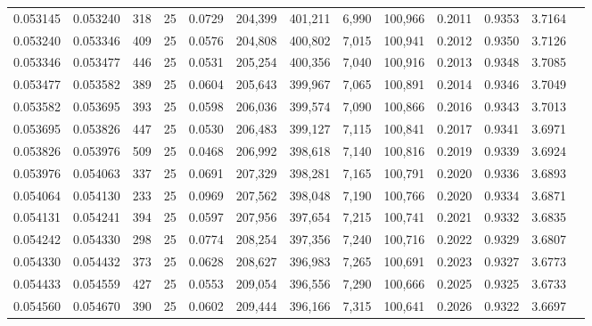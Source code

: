 \begin{tabular}{rrrrrrrrrrrrr}
0.053145 & 0.053240 &   318 &  25 &                                     0.0729 & 204,399 & 401,211 &   6,990 & 100,966 & 0.2011 & 0.9353 & 3.7164 \\
0.053240 & 0.053346 &   409 &  25 &                                     0.0576 & 204,808 & 400,802 &   7,015 & 100,941 & 0.2012 & 0.9350 & 3.7126 \\
0.053346 & 0.053477 &   446 &  25 &                                     0.0531 & 205,254 & 400,356 &   7,040 & 100,916 & 0.2013 & 0.9348 & 3.7085 \\
0.053477 & 0.053582 &   389 &  25 &                                     0.0604 & 205,643 & 399,967 &   7,065 & 100,891 & 0.2014 & 0.9346 & 3.7049 \\
0.053582 & 0.053695 &   393 &  25 &                                     0.0598 & 206,036 & 399,574 &   7,090 & 100,866 & 0.2016 & 0.9343 & 3.7013 \\
0.053695 & 0.053826 &   447 &  25 &                                     0.0530 & 206,483 & 399,127 &   7,115 & 100,841 & 0.2017 & 0.9341 & 3.6971 \\
0.053826 & 0.053976 &   509 &  25 &                                     0.0468 & 206,992 & 398,618 &   7,140 & 100,816 & 0.2019 & 0.9339 & 3.6924 \\
0.053976 & 0.054063 &   337 &  25 &                                     0.0691 & 207,329 & 398,281 &   7,165 & 100,791 & 0.2020 & 0.9336 & 3.6893 \\
0.054064 & 0.054130 &   233 &  25 &                                     0.0969 & 207,562 & 398,048 &   7,190 & 100,766 & 0.2020 & 0.9334 & 3.6871 \\
0.054131 & 0.054241 &   394 &  25 &                                     0.0597 & 207,956 & 397,654 &   7,215 & 100,741 & 0.2021 & 0.9332 & 3.6835 \\
0.054242 & 0.054330 &   298 &  25 &                                     0.0774 & 208,254 & 397,356 &   7,240 & 100,716 & 0.2022 & 0.9329 & 3.6807 \\
0.054330 & 0.054432 &   373 &  25 &                                     0.0628 & 208,627 & 396,983 &   7,265 & 100,691 & 0.2023 & 0.9327 & 3.6773 \\
0.054433 & 0.054559 &   427 &  25 &                                     0.0553 & 209,054 & 396,556 &   7,290 & 100,666 & 0.2025 & 0.9325 & 3.6733 \\
0.054560 & 0.054670 &   390 &  25 &                                     0.0602 & 209,444 & 396,166 &   7,315 & 100,641 & 0.2026 & 0.9322 & 3.6697 \\

\end{tabular}
